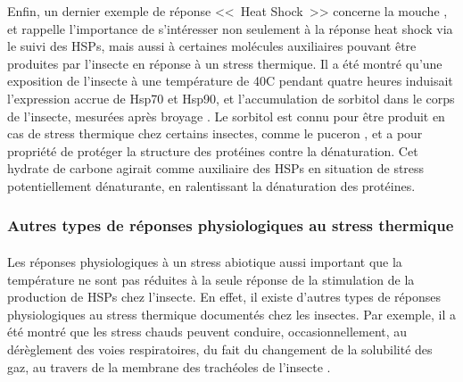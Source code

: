 

		Enfin, un dernier exemple de réponse <<~Heat Shock~>> concerne la mouche , et rappelle l'importance de s'intéresser non seulement à la réponse heat shock via le suivi des HSPs, mais aussi à certaines molécules auxiliaires pouvant être produites par l'insecte en réponse à un stress thermique.
		Il a été montré qu'une exposition de l'insecte à une température de 40\textdegree{}C pendant quatre heures induisait l'expression accrue de Hsp70 et Hsp90, et l'accumulation de sorbitol dans le corps de l'insecte, mesurées après broyage \cite{salvucci2000}.
		Le sorbitol est connu pour être produit en cas de stress thermique chez certains insectes, comme le puceron \cite{hendrix1998}, et a pour propriété de protéger la structure des protéines contre la dénaturation.
		Cet hydrate de carbone agirait comme auxiliaire des HSPs en situation de stress potentiellement dénaturante, en ralentissant la dénaturation des protéines.

		\subsubsection{Autres types de réponses physiologiques au stress thermique} %

		\paragraph*{}
		Les réponses physiologiques à un stress abiotique aussi important que la température ne sont pas réduites à la seule réponse de la stimulation de la production de HSPs chez l'insecte.
		En effet, il existe d'autres types de réponses physiologiques au stress thermique documentés chez les insectes.
		Par exemple, il a été montré que les stress chauds peuvent conduire, occasionnellement, au dérèglement des voies respiratoires, du fait du changement de la solubilité des gaz, au travers de la membrane des trachéoles de l'insecte \cite{neven2000}.

		\paragraph*{}

